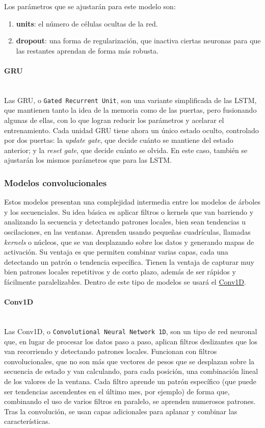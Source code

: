 \documentclass[a4paper,onecolumn]{extarticle}
\begin{document}
\begin{sloppypar}
Los parámetros que se ajustarán para este modelo son:
\begin{enumerate}
    \item \textbf{units}: el número de células ocultas de la red.
    \item \textbf{dropout}: una forma de regularización, que inactiva ciertas neuronas para que las restantes aprendan de forma más robusta.
\end{enumerate}

\paragraph{GRU} \label{GRU}\mbox{} \\
Las GRU, o \texttt{Gated Recurrent Unit}, son una variante simplificada de las LSTM, que mantienen tanto la idea de la memoria como de las puertas, pero fusionando algunas de ellas, 
con lo que logran reducir los parámetros y acelarar el entrenamiento. Cada unidad GRU tiene ahora un único estado oculto, controlado por dos puertas: la \textit{update gate}, que 
decide cuánto se mantiene del estado anterior; y la \textit{reset gate}, que decide cuánto se olvida. En este caso, también se ajustarán los mismos parámetros que para las LSTM.

\subsubsection{Modelos convolucionales}
Estos modelos presentan una complejidad intermedia entre los modelos de árboles y los secuenciales. Su idea básica es aplicar filtros o kernels que van barriendo y analizando 
la secuencia y detectando patrones locales, bien sean tendencias u oscilaciones, en las ventanas. Aprenden usando pequeñas cuadrículas, llamadas \textit{kernels} o núcleos, que 
se van desplazando sobre los datos y generando mapas de activación. Su ventaja es que permiten combinar varias capas, cada una detectando un patrón o tendencia específica. Tienen 
la ventaja de capturar muy bien patrones locales repetitivos y de corto plazo, además de ser rápidos y fácilmente paralelizables. Dentro de este tipo de modelos se usará el \hyperref[C1D]{Conv1D}.

\paragraph{Conv1D} \label{C1D}\mbox{} \\
Las Conv1D, o \texttt{Convolutional Neural Network 1D}, son un tipo de red neuronal que, en lugar de procesar los datos paso a paso, aplican filtros deslizantes que los van recorriendo 
y detectando patrones locales. Funcionan con filtros convolucionales, que no son más que vectores de pesos que se desplazan sobre la secuencia de estado y van calculando, para cada 
posición, una combinación lineal de los valores de la ventana. Cada filtro aprende un patrón específico (que puede ser tendencias ascendentes en el último mes, por ejemplo) de forma que,
combinando el uso de varios filtros en paralelo, se aprenden numerosos patrones. Tras la convolución, se usan capas adicionales para aplanar y combinar las características.


\end{sloppypar}
\end{document}
